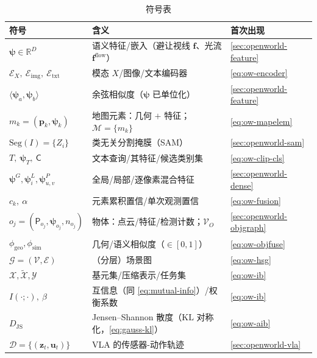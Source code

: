 \begin{table}[H]\centering\small
\caption{符号表}
\begin{tabular}{lll}
\toprule
符号 & 含义 & 首次出现 \\
\midrule
$\boldsymbol\psi\in\mathbb{R}^{D}$ & 语义特征/嵌入（避让视线 $\mathbf{f}$、光流 $\mathbf{f}^{\mathrm{flow}}$）& \cref{sec:openworld-feature} \\
$\mathcal{E}_X,\ \mathcal{E}_{\mathrm{img}},\ \mathcal{E}_{\mathrm{txt}}$ & 模态 $X$/图像/文本编码器 & \cref{eq:ow-encoder} \\
$\langle\boldsymbol\psi_a,\boldsymbol\psi_b\rangle$ & 余弦相似度（$\boldsymbol\psi$ 已单位化）& \cref{sec:openworld-feature} \\
$m_k=(\mathbf{p}_k,\boldsymbol\psi_k)$ & 地图元素：几何 $+$ 特征；$\mathcal{M}=\{m_k\}$ & \cref{eq:ow-mapelem} \\
$\mathrm{Seg}(I)=\{Z_i\}$ & 类无关分割掩膜（SAM）& \cref{sec:openworld-sam} \\
$T,\ \boldsymbol\psi_T,\ \mathsf{C}$ & 文本查询/其特征/候选类别集 & \cref{eq:ow-clip-cls} \\
$\boldsymbol\psi^{G},\boldsymbol\psi_i^{L},\boldsymbol\psi_{u,v}^{P}$ & 全局/局部/逐像素混合特征 & \cref{sec:openworld-dense} \\
$c_k,\ \alpha$ & 元素累积置信/单次观测置信 & \cref{eq:ow-fusion} \\
$o_j=(\mathsf{P}_{o_j},\boldsymbol\psi_{o_j},n_{o_j})$ & 物体：点云/特征/检测计数；$\mathcal{V}_O$ & \cref{sec:openworld-objgraph} \\
$\phi_{\mathrm{geo}},\phi_{\mathrm{sim}}$ & 几何/语义相似度（$\in[0,1]$）& \cref{eq:ow-objfuse} \\
$\mathcal{G}=(\mathcal{V},\mathcal{E})$ & （分层）场景图 & \cref{eq:ow-hsg} \\
$\mathcal{X},\tilde{\mathcal{X}},\mathcal{Y}$ & 基元集/压缩表示/任务集 & \cref{eq:ow-ib} \\
$I(\cdot;\cdot),\ \beta$ & 互信息（同 \cref{eq:mutual-info}）/权衡系数 & \cref{eq:ow-ib} \\
$D_{\mathrm{JS}}$ & Jensen--Shannon 散度（$\mathrm{KL}$ 对称化，\cref{eq:gauss-kl}）& \cref{eq:ow-aib} \\
$\mathcal{D}=\{(\mathbf{z}_t,\mathbf{u}_t)\}$ & VLA 的传感器-动作轨迹 & \cref{sec:openworld-vla} \\
\bottomrule
\end{tabular}
\end{table}

